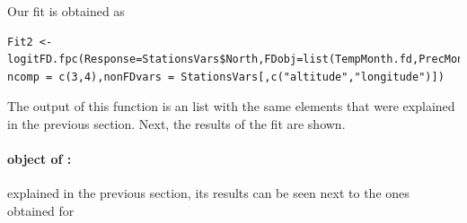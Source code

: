 Our fit is obtained as

\begin{verbatim}
Fit2 <- logitFD.fpc(Response=StationsVars$North,FDobj=list(TempMonth.fd,PrecMonth.fd),
ncomp = c(3,4),nonFDvars = StationsVars[,c("altitude","longitude")])
\end{verbatim}

The output of this function is an  list with the same elements that were explained in the previous section. Next, the results of the fit are shown.

\paragraph{ object of :} explained in the previous section, its results can be seen next to the ones obtained for 

